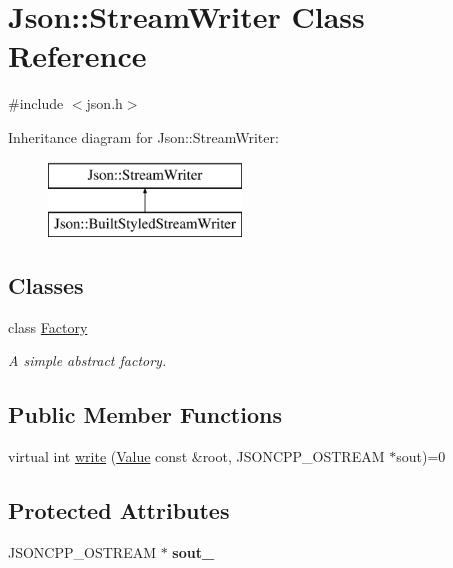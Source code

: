 \hypertarget{classJson_1_1StreamWriter}{}\section{Json\+:\+:Stream\+Writer Class Reference}
\label{classJson_1_1StreamWriter}


{\ttfamily \#include $<$json.\+h$>$}

Inheritance diagram for Json\+:\+:Stream\+Writer\+:\begin{figure}[H]
\begin{center}
\leavevmode
\includegraphics[height=2.000000cm]{classJson_1_1StreamWriter}
\end{center}
\end{figure}
\subsection*{Classes}
\begin{DoxyCompactItemize}
\item 
class \hyperlink{classJson_1_1StreamWriter_1_1Factory}{Factory}
\begin{DoxyCompactList}\small\item\em A simple abstract factory. \end{DoxyCompactList}\end{DoxyCompactItemize}
\subsection*{Public Member Functions}
\begin{DoxyCompactItemize}
\item 
virtual int \hyperlink{classJson_1_1StreamWriter_a84278bad0c9a9fc587bc2a97c5bb5993}{write} (\hyperlink{classJson_1_1Value}{Value} const \&root, J\+S\+O\+N\+C\+P\+P\+\_\+\+O\+S\+T\+R\+E\+AM $\ast$sout)=0
\end{DoxyCompactItemize}
\subsection*{Protected Attributes}
\begin{DoxyCompactItemize}
\item 
\mbox{\label{classJson_1_1StreamWriter_a4f5603d4228a9fa46a42cb44e5234d9b}} 
J\+S\+O\+N\+C\+P\+P\+\_\+\+O\+S\+T\+R\+E\+AM $\ast$ {\bfseries sout\+\_\+}
\end{DoxyCompactItemize}


